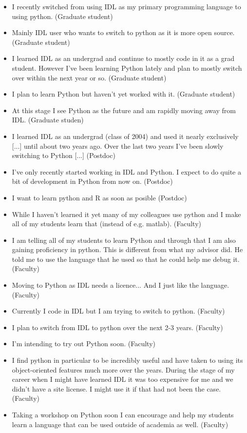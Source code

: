 \begin{itemize}
\item{I recently switched from using IDL as my primary programming language to using python. (Graduate student)}
\item{Mainly IDL user who wants to switch to python as it is more open source. (Graduate student)}
\item{I learned IDL as an undergrad and continue to mostly code in it as a grad student. However I've been learning Python lately and plan to mostly switch over within the next year or so. (Graduate student)}
\item{I plan to learn Python but haven't yet worked with it. (Graduate student)}
\item{At this stage I see Python as the future and am rapidly moving away from IDL. (Graduate studen)}
\item{I learned IDL as an undergrad (class of 2004) and used it nearly exclusively [...] until about two years ago. Over the last two years I've been slowly switching to Python [...]
(Postdoc)}
\item{I've only recently started working in IDL and Python.  I expect to do quite a bit of development in Python from now on. (Postdoc)}
\item{I want to learn python and R as soon as posible (Postdoc)}
\item{While I haven't learned it yet many of my colleagues use python and I make all of my students learn that (instead of e.g. matlab). (Faculty)}
\item{I am telling all of my students to learn Python and through that I am also gaining proficiency in python.  This is different from what my advisor did.  He told me to use the language that he used so that he could help me debug it. (Faculty)}
\item{Moving to Python as IDL needs a licence... And I just like the language. (Faculty)}
\item{Currently I code in IDL but I am trying to switch to python. (Faculty)}
\item{I plan to switch from IDL to python over the next 2-3 years. (Faculty)}
\item{I'm intending to try out Python soon. (Faculty)}
\item{I find python in particular to be incredibly useful and have taken to using its object-oriented features much more over the years.  During the stage of my career when I might have learned IDL it was too expensive for me and we didn't have a site license.  I might use it if that had not been the case. (Faculty)}
\item{Taking a workshop on Python soon I can encourage and help my students learn a language that can be used outside of academia as well. (Faculty)}
\end{itemize}


